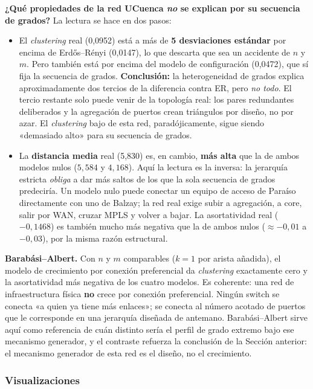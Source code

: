 \documentclass[10pt,a4paper]{extarticle}
\begin{document}
\textbf{¿Qué propiedades de la red UCuenca \textit{no} se explican por su secuencia de
grados?} La lectura se hace en dos pasos:

\begin{itemize}[leftmargin=*,itemsep=1.5mm]
\item El \textit{clustering} real (0,0952) está a más de \textbf{5 desviaciones estándar}
por encima de Erdős--Rényi (0,0147), lo que descarta que sea un accidente de $n$ y $m$.
Pero también está por encima del modelo de configuración (0,0472), que sí fija la
secuencia de grados. \textbf{Conclusión:} la heterogeneidad de grados explica
aproximadamente dos tercios de la diferencia contra ER, pero \textit{no todo}. El tercio
restante solo puede venir de la topología real: los pares redundantes deliberados y la
agregación de puertos crean triángulos por diseño, no por azar. El \textit{clustering}
bajo de esta red, paradójicamente, sigue siendo «demasiado alto» para su secuencia de
grados.

\item La \textbf{distancia media} real (5,830) es, en cambio, \textbf{más alta} que la de
ambos modelos nulos ($5{,}584$ y $4{,}168$). Aquí la lectura es la inversa: la jerarquía
estricta \textit{obliga} a dar más saltos de los que la sola secuencia de grados
predeciría. Un modelo nulo puede conectar un equipo de acceso de Paraíso directamente con
uno de Balzay; la red real exige subir a agregación, a core, salir por WAN, cruzar MPLS y
volver a bajar. La asortatividad real ($-0{,}1468$) es también mucho más negativa que la
de ambos nulos ($\approx -0{,}01$ a $-0{,}03$), por la misma razón estructural.
\end{itemize}

\textbf{Barabási--Albert.} Con $n$ y $m$ comparables ($k=1$ por arista añadida), el modelo
de crecimiento por conexión preferencial da \textit{clustering} exactamente cero y la
asortatividad más negativa de los cuatro modelos. Es coherente: una red de infraestructura
física \textbf{no} crece por conexión preferencial. Ningún switch se conecta «a quien ya
tiene más enlaces»; se conecta al número acotado de puertos que le corresponde en una
jerarquía diseñada de antemano. Barabási--Albert sirve aquí como referencia de cuán
distinto sería el perfil de grado extremo bajo ese mecanismo generador, y el contraste
refuerza la conclusión de la Sección anterior: el mecanismo generador de esta red es el
diseño, no el crecimiento.

\subsubsection{Visualizaciones}
\end{document}
